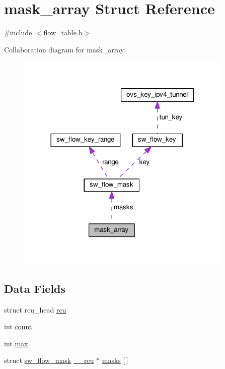\hypertarget{structmask__array}{}\section{mask\+\_\+array Struct Reference}
\label{structmask__array}


{\ttfamily \#include $<$flow\+\_\+table.\+h$>$}



Collaboration diagram for mask\+\_\+array\+:
\nopagebreak
\begin{figure}[H]
\begin{center}
\leavevmode
\includegraphics[width=293pt]{structmask__array__coll__graph}
\end{center}
\end{figure}
\subsection*{Data Fields}
\begin{DoxyCompactItemize}
\item 
struct rcu\+\_\+head \hyperlink{structmask__array_ac1e5ee290959115397221781b7ad1c6e}{rcu}
\item 
int \hyperlink{structmask__array_a55b8fb7e2d7ad8a5725a749645f73b5a}{count}
\item 
int \hyperlink{structmask__array_ad981d54486b5dd03bdb4ad20b740171e}{max}
\item 
struct \hyperlink{structsw__flow__mask}{sw\+\_\+flow\+\_\+mask} \hyperlink{compiler_8h_a2b3b0c016258969e4b39c66b6eec2129}{\+\_\+\+\_\+rcu} $\ast$ \hyperlink{structmask__array_a92da2b0ebde32eb6f76a134dc2d61d79}{masks} \mbox{[}$\,$\mbox{]}
\end{DoxyCompactItemize}


